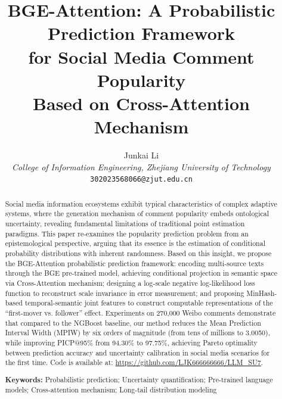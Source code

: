\documentclass[10pt]{article}
\begin{document}
\title{\textbf{BGE-Attention: A Probabilistic Prediction Framework\\for Social Media Comment Popularity\\Based on Cross-Attention Mechanism}}

\author{
    Junkai Li\\
    \textit{College of Information Engineering, Zhejiang University of Technology}\\
    \texttt{302023568066@zjut.edu.cn}
}

\date{}

\maketitle

\begin{abstract}
Social media information ecosystems exhibit typical characteristics of complex adaptive systems, where the generation mechanism of comment popularity embeds ontological uncertainty, revealing fundamental limitations of traditional point estimation paradigms. This paper re-examines the popularity prediction problem from an epistemological perspective, arguing that its essence is the estimation of conditional probability distributions with inherent randomness. Based on this insight, we propose the BGE-Attention probabilistic prediction framework: encoding multi-source texts through the BGE pre-trained model, achieving conditional projection in semantic space via Cross-Attention mechanism; designing a log-scale negative log-likelihood loss function to reconstruct scale invariance in error measurement; and proposing MinHash-based temporal-semantic joint features to construct computable representations of the ``first-mover vs. follower'' effect. Experiments on 270,000 Weibo comments demonstrate that compared to the NGBoost baseline, our method reduces the Mean Prediction Interval Width (MPIW) by six orders of magnitude (from tens of millions to 3.0050), while improving PICP@95\% from 94.30\% to 97.75\%, achieving Pareto optimality between prediction accuracy and uncertainty calibration in social media scenarios for the first time. Code is available at: \url{https://github.com/LJK666666666/LLM_SU7}.

\textbf{Keywords:} Probabilistic prediction; Uncertainty quantification; Pre-trained language models; Cross-attention mechanism; Long-tail distribution modeling
\end{abstract}
\end{document}
